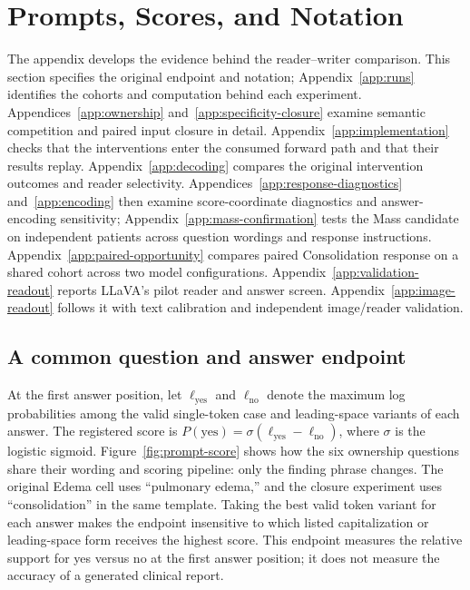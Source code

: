 \raggedbottom
\setcounter{figure}{0}
\renewcommand{\thefigure}{A\arabic{figure}}
\renewcommand{\theHfigure}{appendix.A.\arabic{figure}}
\setcounter{table}{0}
\renewcommand{\thetable}{A\arabic{table}}
\renewcommand{\theHtable}{appendix.A.\arabic{table}}

\section{Prompts, Scores, and Notation}
\label{app:protocol}

The appendix develops the evidence behind the reader--writer comparison.
This section specifies the original endpoint and notation;
Appendix~\ref{app:runs} identifies the cohorts and computation behind each
experiment. Appendices~\ref{app:ownership} and~\ref{app:specificity-closure}
examine semantic competition and paired input closure in detail.
Appendix~\ref{app:implementation} checks that the interventions enter the
consumed forward path and that their results replay.
Appendix~\ref{app:decoding} compares the original intervention outcomes and
reader selectivity. Appendices~\ref{app:response-diagnostics} and~\ref{app:encoding}
then examine score-coordinate diagnostics and answer-encoding sensitivity;
Appendix~\ref{app:mass-confirmation} tests the Mass candidate on independent
patients across question wordings and response instructions.
Appendix~\ref{app:paired-opportunity} compares paired Consolidation response
on a shared cohort across two model configurations. Appendix~\ref{app:validation-readout}
reports LLaVA's pilot reader and answer screen. Appendix~\ref{app:image-readout}
follows it with text calibration and independent image/reader validation.

\subsection{A common question and answer endpoint}

At the first answer position, let $\ell_{\mathrm{yes}}$ and
$\ell_{\mathrm{no}}$ denote the maximum log probabilities among the valid
single-token case and leading-space variants of each answer.  The registered
score is $P(\mathrm{yes})=\sigma(\ell_{\mathrm{yes}}-\ell_{\mathrm{no}})$,
where $\sigma$ is the logistic sigmoid. Figure~\ref{fig:prompt-score} shows
how the six ownership questions share their wording and scoring pipeline:
only the finding phrase changes. The original Edema cell uses ``pulmonary
edema,'' and the closure experiment uses ``consolidation'' in the same
template. Taking the best valid token variant for each answer makes the
endpoint insensitive to which listed capitalization or leading-space form
receives the highest score. This endpoint measures the relative support for
yes versus no at the first answer position; it does not measure the accuracy
of a generated clinical report.

